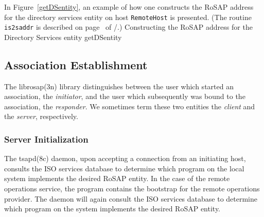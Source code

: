 In Figure~\ref{getDSentity},
an example of how one constructs the RoSAP address for the directory services
entity on host \verb"RemoteHost" is presented.
(The routine \verb"is2saddr" is described on page~\pageref{ssap:addresses}
of \voltwo/.)
%
        {Constructing the RoSAP address for the Directory Services entity}%
        {getDSentity}

\subsection       {Association Establishment}
The \man librosap(3n) library distinguishes between the user which started an
association,
the {\em initiator},
and the user which subsequently was bound to the association,
the {\em responder}.
We sometimes term these two entities the {\em client\/} and the {\em server},
respectively.

\subsubsection     {Server Initialization}
The \man tsapd(8c) daemon,
upon accepting a connection from an initiating host,
consults the ISO services database to determine which program
on the local system implements the desired RoSAP entity.
In the case of the remote operations service,
the  program contains the bootstrap for the remote operations
provider.
The daemon will again consult the ISO services database to determine which
program on the system implements the desired RoSAP entity.

